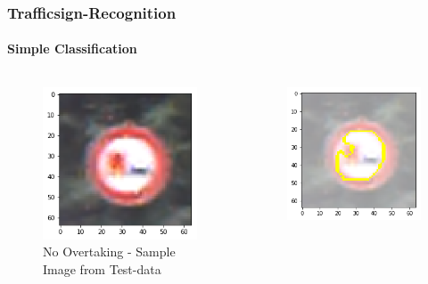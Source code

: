 \begin{frame}
	\frametitle{Trafficsign-Recognition}
	\framesubtitle{Simple Classification}
	
	\begin{columns}
		\begin{column}{0.33\textwidth}
			\begin{center}
				\begin{figure}[H]
					\includegraphics[width=0.9\linewidth]{Images/NoOvertaking}
					\caption[No Overtaking]{No Overtaking - Sample Image from Test-data}
					\label{fig:noovertaking}
				\end{figure}
			\end{center}		
		\end{column}
		\begin{column}{0.33\textwidth}
			\begin{center}
				\begin{figure}[H]
					\includegraphics[width=0.9\linewidth]{Images/NoOvertakingCorrectClass}

\end{figure}
\end{center}
\end{column}
\end{columns}
\end{frame}

